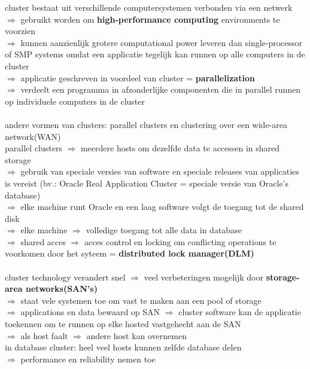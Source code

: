 \documentclass{report}
\begin{document}
cluster bestaat uit verschillende computersystemen verbonden via een netwerk
\\$\Rightarrow$ gebruikt worden om \textbf{high-performance computing} environments te voorzien
\\$\Rightarrow$ kunnen aanzienlijk grotere computational power leveren dan single-processor of SMP systems omdat een applicatie tegelijk kan runnen op alle computers in de cluster
\\$\Rightarrow$ applicatie geschreven in voordeel van cluster = \textbf{parallelization}
\\$\Rightarrow$ verdeelt een programma in afzonderlijke componenten die in parallel runnen op individuele computers in de cluster
\\
\\andere vormen van clusters: parallel clusters en clustering over een wide-area network(WAN)
\\parallel clusters $\Rightarrow$ meerdere hosts om dezelfde data te accessen in shared storage
\\$\Rightarrow$ gebruik van speciale versies van software en speciale releases van applicaties is vereist (bv.: Oracle Real Application Cluster = speciale versie van Oracle's database)
\\$\Rightarrow$ elke machine runt Oracle en een laag software volgt de toegang tot de shared disk
\\$\Rightarrow$ elke machine $\Rightarrow$ volledige toegang tot alle data in database
\\$\Rightarrow$ shared acces $\Rightarrow$ acces control en locking om conflicting operations te voorkomen door het syteem = \textbf{distributed lock manager(DLM)} 
\\
\\cluster technology verandert snel $\Rightarrow$ veel verbeteringen mogelijk door \textbf{storage-area networks(SAN's)} 
\\$\Rightarrow$ staat vele systemen toe om vast te maken aan een pool of storage
\\$\Rightarrow$ applications en data bewaard op SAN $\Rightarrow$ cluster software kan de applicatie toekennen om te runnen op elke hosted vastgehecht aan de SAN
\\$\Rightarrow$ als host faalt $\Rightarrow$ andere host kan overnemen
\\in database cluster: heel veel hosts kunnen zelfde database delen
\\$\Rightarrow$ performance en reliability nemen toe
\end{document}

